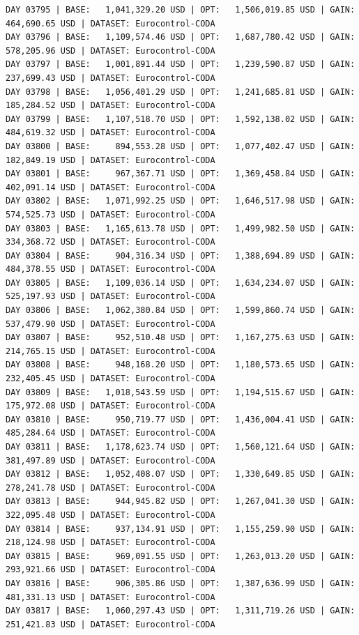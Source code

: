 \documentclass[11pt,a4paper]{article}
\begin{document}
\begin{verbatim}
DAY 03795 | BASE:   1,041,329.20 USD | OPT:   1,506,019.85 USD | GAIN: 464,690.65 USD | DATASET: Eurocontrol-CODA
DAY 03796 | BASE:   1,109,574.46 USD | OPT:   1,687,780.42 USD | GAIN: 578,205.96 USD | DATASET: Eurocontrol-CODA
DAY 03797 | BASE:   1,001,891.44 USD | OPT:   1,239,590.87 USD | GAIN: 237,699.43 USD | DATASET: Eurocontrol-CODA
DAY 03798 | BASE:   1,056,401.29 USD | OPT:   1,241,685.81 USD | GAIN: 185,284.52 USD | DATASET: Eurocontrol-CODA
DAY 03799 | BASE:   1,107,518.70 USD | OPT:   1,592,138.02 USD | GAIN: 484,619.32 USD | DATASET: Eurocontrol-CODA
DAY 03800 | BASE:     894,553.28 USD | OPT:   1,077,402.47 USD | GAIN: 182,849.19 USD | DATASET: Eurocontrol-CODA
DAY 03801 | BASE:     967,367.71 USD | OPT:   1,369,458.84 USD | GAIN: 402,091.14 USD | DATASET: Eurocontrol-CODA
DAY 03802 | BASE:   1,071,992.25 USD | OPT:   1,646,517.98 USD | GAIN: 574,525.73 USD | DATASET: Eurocontrol-CODA
DAY 03803 | BASE:   1,165,613.78 USD | OPT:   1,499,982.50 USD | GAIN: 334,368.72 USD | DATASET: Eurocontrol-CODA
DAY 03804 | BASE:     904,316.34 USD | OPT:   1,388,694.89 USD | GAIN: 484,378.55 USD | DATASET: Eurocontrol-CODA
DAY 03805 | BASE:   1,109,036.14 USD | OPT:   1,634,234.07 USD | GAIN: 525,197.93 USD | DATASET: Eurocontrol-CODA
DAY 03806 | BASE:   1,062,380.84 USD | OPT:   1,599,860.74 USD | GAIN: 537,479.90 USD | DATASET: Eurocontrol-CODA
DAY 03807 | BASE:     952,510.48 USD | OPT:   1,167,275.63 USD | GAIN: 214,765.15 USD | DATASET: Eurocontrol-CODA
DAY 03808 | BASE:     948,168.20 USD | OPT:   1,180,573.65 USD | GAIN: 232,405.45 USD | DATASET: Eurocontrol-CODA
DAY 03809 | BASE:   1,018,543.59 USD | OPT:   1,194,515.67 USD | GAIN: 175,972.08 USD | DATASET: Eurocontrol-CODA
DAY 03810 | BASE:     950,719.77 USD | OPT:   1,436,004.41 USD | GAIN: 485,284.64 USD | DATASET: Eurocontrol-CODA
DAY 03811 | BASE:   1,178,623.74 USD | OPT:   1,560,121.64 USD | GAIN: 381,497.89 USD | DATASET: Eurocontrol-CODA
DAY 03812 | BASE:   1,052,408.07 USD | OPT:   1,330,649.85 USD | GAIN: 278,241.78 USD | DATASET: Eurocontrol-CODA
DAY 03813 | BASE:     944,945.82 USD | OPT:   1,267,041.30 USD | GAIN: 322,095.48 USD | DATASET: Eurocontrol-CODA
DAY 03814 | BASE:     937,134.91 USD | OPT:   1,155,259.90 USD | GAIN: 218,124.98 USD | DATASET: Eurocontrol-CODA
DAY 03815 | BASE:     969,091.55 USD | OPT:   1,263,013.20 USD | GAIN: 293,921.66 USD | DATASET: Eurocontrol-CODA
DAY 03816 | BASE:     906,305.86 USD | OPT:   1,387,636.99 USD | GAIN: 481,331.13 USD | DATASET: Eurocontrol-CODA
DAY 03817 | BASE:   1,060,297.43 USD | OPT:   1,311,719.26 USD | GAIN: 251,421.83 USD | DATASET: Eurocontrol-CODA

\end{verbatim}
\end{document}
